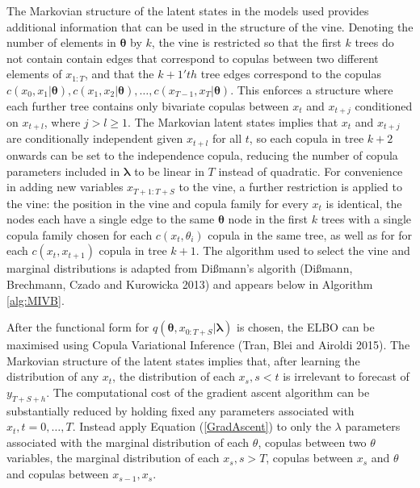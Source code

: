 \documentclass[12pt,a4paper]{article}%
\numberwithin{equation}{section}
\begin{document}
The Markovian structure of the latent states in the models used provides additional information that can be used in the structure of the vine. Denoting the number of elements in $\boldsymbol{\theta}$ by $k$, the vine is restricted so that the first $k$ trees do not contain contain edges that correspond to copulas between two different elements of $x_{1:T}$, and that the $k+1'th$ tree edges correspond to the copulas $c(x_0, x_1 | \boldsymbol{\theta}), c(x_1, x_2 | \boldsymbol{\theta}), \dots, c(x_{T-1}, x_T | \boldsymbol{\theta})$. This enforces a structure where each further tree contains only bivariate copulas between $x_t$ and $x_{t+j}$ conditioned on $x_{t+l}$, where $j > l \geq 1$. The Markovian latent states implies that $x_t$ and $x_{t+j}$ are conditionally independent given $x_{t+l}$ for all $t$, so each copula in tree $k+2$ onwards can be set to the independence copula, reducing the number of copula parameters included in $\boldsymbol{\lambda}$ to be linear in $T$ instead of quadratic. For convenience in adding new variables $x_{T+1:T+S}$ to the vine, a further restriction is applied to the vine: the position in the vine and copula family for every $x_t$ is identical, the nodes each have a single edge to the same $\boldsymbol{\theta}$ node in the first $k$ trees with a single copula family chosen for each $c(x_t, \theta_i)$ copula in the same tree, as well as for for each $c(x_t, x_{t+1})$ copula in tree $k+1$. The algorithm used to select the vine and marginal distributions is adapted from Di{\ss}mann's algorith (Di{\ss}mann, Brechmann, Czado and Kurowicka 2013) and appears below in Algorithm \ref{alg:MIVB}.

After the functional form for $q(\boldsymbol{\theta}, x_{0:T+S} | \boldsymbol{\lambda})$ is chosen, the ELBO can be maximised using Copula Variational Inference (Tran, Blei and Airoldi 2015). The Markovian structure of the latent states implies that, after learning the distribution of any $x_t$, the distribution of each $x_s, s < t$ is irrelevant to forecast of $y_{T+S+h}$. The computational cost of the gradient ascent algorithm can be substantially reduced by holding fixed any parameters associated with $x_t, t = 0, \dots, T$. Instead apply Equation (\ref{GradAscent}) to only the $\lambda$ parameters associated with the marginal distribution of each $\theta$, copulas between two $\theta$ variables, the marginal distribution of each $x_s, s > T$, copulas between $x_s$ and $\theta$ and copulas between $x_{s-1}, x_s$. 
\end{document}

